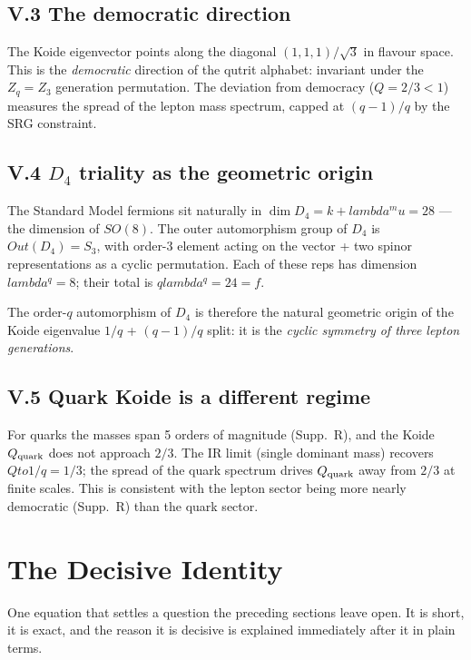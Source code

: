 \documentclass[12pt,a4paper]{article}
\def\mathbb#1{#1}%
\def\mathrm#1{#1}%
\def\lambda{lambda}%
\def\mu{mu}%
\def\cdot{ }%
\def\to{ to }%
\theoremstyle{definition}
\newcommand{\SO}{\mathrm{SO}}
\newcommand{\ZZ}{\mathbb{Z}}
\begin{document}
\subsection*{V.3 \quad The democratic direction}
The Koide eigenvector points along the diagonal
$(1,1,1)/\sqrt{3}$ in flavour space. This is the
\emph{democratic} direction of the qutrit alphabet: invariant under the
$\ZZ_q = \ZZ_3$ generation permutation. The deviation from democracy
($Q=2/3 < 1$) measures the spread of the lepton mass spectrum, capped
at $(q-1)/q$ by the SRG constraint.

\subsection*{V.4 \quad $D_4$ triality as the geometric origin}
The Standard Model fermions sit naturally in
$\dim D_4 = k+\lambda^\mu = 28$ — the dimension of $\SO(8)$. The outer
automorphism group of $D_4$ is $\mathrm{Out}(D_4) = S_3$, with
order-3 element acting on the vector + two spinor representations as a
cyclic permutation. Each of these reps has dimension $\lambda^q = 8$;
their total is $q\cdot\lambda^q = 24 = f$.

The order-$q$ automorphism of $D_4$ is therefore the natural
geometric origin of the Koide eigenvalue $1/q$ + $(q-1)/q$ split: it
is the \emph{cyclic symmetry of three lepton generations}.

\subsection*{V.5 \quad Quark Koide is a different regime}
For quarks the masses span 5 orders of magnitude (Supp.~R), and the
Koide $Q_{\rm quark}$ does not approach $2/3$. The IR limit (single
dominant mass) recovers $Q\to 1/q = 1/3$; the spread of the quark
spectrum drives $Q_{\rm quark}$ away from $2/3$ at finite scales.
This is consistent with the lepton sector being more nearly
democratic (Supp.~R) than the quark sector.

\section*{The Decisive Identity}

\begin{plainbox}
One equation that settles a question the preceding sections leave open. It is short,
it is exact, and the reason it is decisive is explained immediately after it in plain
terms.
\end{plainbox}
\end{document}
